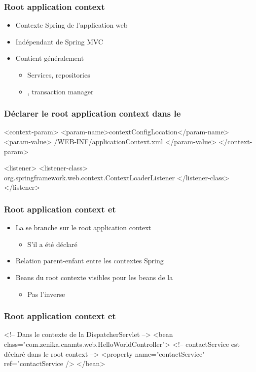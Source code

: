 \begin{frame}
 \frametitle{Root application context}
 
  \begin{itemize}
   \item Contexte Spring de l'application web
   \item Indépendant de Spring MVC
   \item Contient généralement
   \begin{itemize}
    \item Services, repositories
    \item {}, transaction manager
   \end{itemize}
  \end{itemize}
 
\end{frame}

\begin{frame}[fragile]
 \frametitle{Déclarer le root application context dans le }
  
 \begin{xmlcode}
<context-param>
  <param-name>contextConfigLocation</param-name>
  <param-value>
    /WEB-INF/applicationContext.xml
  </param-value>
</context-param>

<listener>
  <listener-class>
    org.springframework.web.context.ContextLoaderListener
  </listener-class>
</listener>
 \end{xmlcode}
 
\end{frame}

\begin{frame}
 \frametitle{Root application context et }
 
 \begin{itemize}
  \item La  se branche sur le root application context
  \begin{itemize}
   \item S'il a été déclaré
  \end{itemize}
  \item Relation parent-enfant entre les contextes Spring
  \item Beans du root contexte visibles pour les beans de la 
  \begin{itemize}
   \item Pas l'inverse
  \end{itemize}
 \end{itemize}
 
\end{frame}

\begin{frame}[fragile]
 \frametitle{Root application context et }
 
 \begin{xmlcode}
<!-- Dans le contexte de la DispatcherServlet -->
<bean class="com.zenika.cnamts.web.HelloWorldController">
  <!-- contactService est d\'eclar\'e dans le root context -->
  <property name="contactService" 
            ref="contactService />
</bean>
 \end{xmlcode}
 
\end{frame}